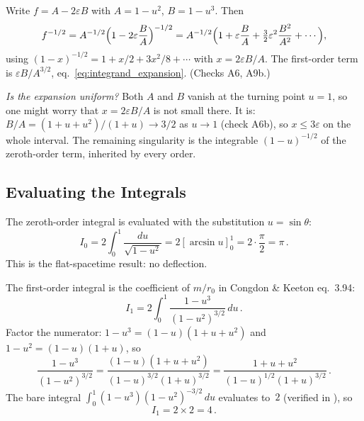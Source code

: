 \begin{derivation}
Write $f = A - 2\varepsilon B$ with $A = 1-u^2$, $B = 1-u^3$.  Then
\[
    f^{-1/2} = A^{-1/2}\Bigl(1 - 2\varepsilon\frac{B}{A}\Bigr)^{-1/2}
    = A^{-1/2}\Bigl(1 + \varepsilon\frac{B}{A} + \tfrac{3}{2}\varepsilon^2\frac{B^2}{A^2}
      + \cdots\Bigr),
\]
using $(1-x)^{-1/2} = 1 + x/2 + 3x^2/8 + \cdots$ with $x = 2\varepsilon B/A$.
The first-order term is $\varepsilon B/A^{3/2}$, eq.~\eqref{eq:integrand_expansion}.
(Checks A6, A9b.)

\textit{Is the expansion uniform?}  Both $A$ and $B$ vanish at the turning point
$u = 1$, so one might worry that $x = 2\varepsilon B/A$ is not small there.  It
is: $B/A = (1+u+u^2)/(1+u) \to 3/2$ as $u \to 1$ (check A6b), so
$x \le 3\varepsilon$ on the whole interval.  The remaining singularity is the
integrable $(1-u)^{-1/2}$ of the zeroth-order term, inherited by every order.
\end{derivation}
\subsection{Evaluating the Integrals}
\label{sec:integral_evaluation}

The zeroth-order integral is evaluated with the substitution
$u = \sin\theta$:
\begin{equation}
    I_0 = 2\int_0^1 \frac{du}{\sqrt{1 - u^2}}
    = 2\left[\arcsin u\right]_0^1 = 2 \cdot \frac{\pi}{2} = \pi \,.
    \label{eq:I0}
\end{equation}
This is the flat-spacetime result: no deflection.

The first-order integral is the coefficient of $m/r_0$ in Congdon \&
Keeton eq.~3.94:
\begin{equation}
    I_1 = 2\int_0^1 \frac{1 - u^3}{(1 - u^2)^{3/2}}\, du \,.
    \label{eq:I1_def}
\end{equation}
Factor the numerator: $1 - u^3 = (1 - u)(1 + u + u^2)$ and
$1 - u^2 = (1-u)(1+u)$, so
\begin{equation}
    \frac{1 - u^3}{(1-u^2)^{3/2}}
    = \frac{(1-u)(1 + u + u^2)}{(1-u)^{3/2}(1+u)^{3/2}}
    = \frac{1 + u + u^2}{(1-u)^{1/2}(1+u)^{3/2}} \,.
    \label{eq:integrand_factored}
\end{equation}
The bare integral $\int_0^1 (1-u^3)(1-u^2)^{-3/2}\, du$ evaluates
to~$2$ (verified in
),
so
\begin{equation}
    I_1 = 2 \times 2 = 4 \,.
    \label{eq:I1_result}
\end{equation}

